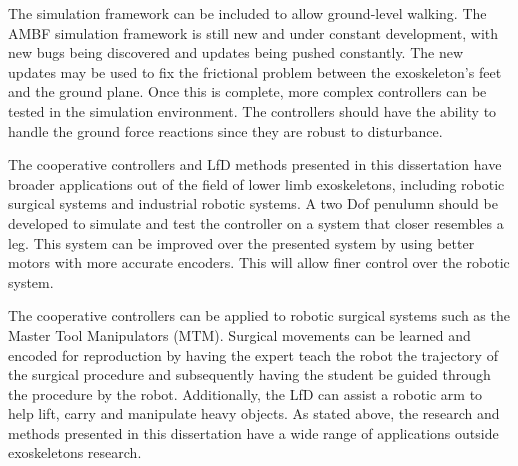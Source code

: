 The simulation framework can be included to allow ground-level walking. The AMBF simulation framework is still new and under constant development, with new bugs being discovered and updates being pushed constantly. The new updates may be used to fix the frictional problem between the exoskeleton's feet and the ground plane. Once this is complete, more complex controllers can be tested in the simulation environment. The controllers should have the ability to handle the ground force reactions since they are robust to disturbance. 


The cooperative controllers and LfD methods presented in this dissertation have broader applications out of the field of lower limb exoskeletons, including robotic surgical systems and industrial robotic systems. A two Dof penulumn should be developed to simulate and test the controller on a system that closer resembles a leg. This system can be improved over the presented system by using better motors with more accurate encoders. This will allow finer control over the robotic system. 

The cooperative controllers can be applied to robotic surgical systems such as the Master Tool Manipulators (MTM). Surgical movements can be learned and encoded for reproduction by having the expert teach the robot the trajectory of the surgical procedure and subsequently having the student be guided through the procedure by the robot. Additionally, the LfD can assist a robotic arm to help lift, carry and manipulate heavy objects. As stated above, the research and methods presented in this dissertation have a wide range of applications outside exoskeletons research.  








   